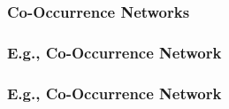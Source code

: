 \documentclass[xcolor=dvipsnames,notes]{beamer}
\begin{document}

\begin{frame}
\frametitle{Co-Occurrence Networks}
\end{frame}

\begin{frame}
\frametitle{E.g., Co-Occurrence Network}
\end{frame}

\begin{frame}
\frametitle{E.g., Co-Occurrence Network}
\end{frame}



% 

% 


% 


\end{document}
